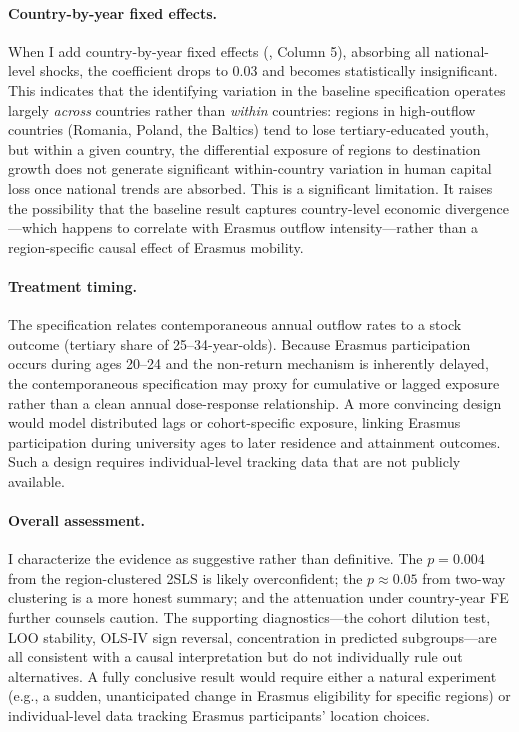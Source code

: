 \documentclass[12pt]{article}
\begin{document}
\paragraph{Country-by-year fixed effects.} When I add country-by-year fixed effects (, Column 5), absorbing all national-level shocks, the coefficient drops to 0.03 and becomes statistically insignificant. This indicates that the identifying variation in the baseline specification operates largely \textit{across} countries rather than \textit{within} countries: regions in high-outflow countries (Romania, Poland, the Baltics) tend to lose tertiary-educated youth, but within a given country, the differential exposure of regions to destination growth does not generate significant within-country variation in human capital loss once national trends are absorbed. This is a significant limitation. It raises the possibility that the baseline result captures country-level economic divergence---which happens to correlate with Erasmus outflow intensity---rather than a region-specific causal effect of Erasmus mobility.

\paragraph{Treatment timing.} The specification relates contemporaneous annual outflow rates to a stock outcome (tertiary share of 25--34-year-olds). Because Erasmus participation occurs during ages 20--24 and the non-return mechanism is inherently delayed, the contemporaneous specification may proxy for cumulative or lagged exposure rather than a clean annual dose-response relationship. A more convincing design would model distributed lags or cohort-specific exposure, linking Erasmus participation during university ages to later residence and attainment outcomes. Such a design requires individual-level tracking data that are not publicly available.

\paragraph{Overall assessment.} I characterize the evidence as suggestive rather than definitive. The $p = 0.004$ from the region-clustered 2SLS is likely overconfident; the $p \approx 0.05$ from two-way clustering is a more honest summary; and the attenuation under country-year FE further counsels caution. The supporting diagnostics---the cohort dilution test, LOO stability, OLS-IV sign reversal, concentration in predicted subgroups---are all consistent with a causal interpretation but do not individually rule out alternatives. A fully conclusive result would require either a natural experiment (e.g., a sudden, unanticipated change in Erasmus eligibility for specific regions) or individual-level data tracking Erasmus participants' location choices.
\end{document}
